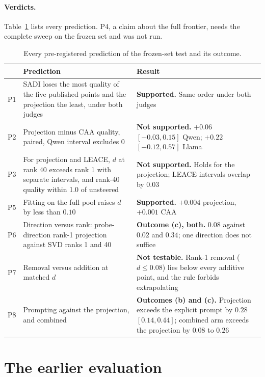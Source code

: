 \paragraph{Verdicts.} Table~\ref{tab:verdicts} lists every prediction. P4, a claim about
the full frontier, needs the complete sweep on the frozen set and was not run.

\begin{table}[t]
\centering\small
\begin{tabular}{@{}lp{6.2cm}p{7.2cm}@{}}
\toprule
& Prediction & Result \\
\midrule
P1 & SADI loses the most quality of the five published points and the projection the
least, under both judges & \textbf{Supported.} Same order under both judges \\
P2 & Projection minus CAA quality, paired, Qwen interval excludes 0 & \textbf{Not
supported.} $+0.06$ $[-0.03, 0.15]$ Qwen; $+0.22$ $[-0.12, 0.57]$ Llama \\
P3 & For projection and LEACE, $d$ at rank 40 exceeds rank 1 with separate intervals, and
rank-40 quality within 1.0 of unsteered & \textbf{Not supported.} Holds for the
projection; LEACE intervals overlap by $0.03$ \\
P5 & Fitting on the full pool raises $d$ by less than $0.10$ & \textbf{Supported.}
$+0.004$ projection, $+0.001$ CAA \\
P6 & Direction versus rank: probe-direction rank-1 projection against SVD ranks 1 and 40 &
\textbf{Outcome (c), both.} $0.08$ against $0.02$ and $0.34$; one direction does not
suffice \\
P7 & Removal versus addition at matched $d$ & \textbf{Not testable.} Rank-1 removal
($d \leq 0.08$) lies below every additive point, and the rule forbids extrapolating \\
P8 & Prompting against the projection, and combined & \textbf{Outcomes (b) and (c).}
Projection exceeds the explicit prompt by $0.28$ $[0.14, 0.44]$; combined arm exceeds the
projection by $0.08$ to $0.26$ \\
\bottomrule
\end{tabular}
\caption{Every pre-registered prediction of the frozen-set test and its outcome.}
\label{tab:verdicts}
\end{table}



\section{The earlier evaluation}
\label{app:earlier}

